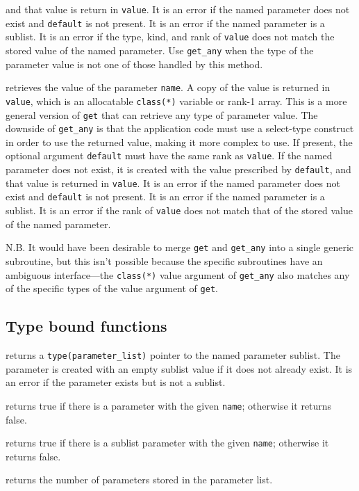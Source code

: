 \documentclass[11pt]{article}
\begin{document}
\begin{description}[style=nextline]
  and that value is return in \texttt{value}.  It is an error if the named
  parameter does not exist and \texttt{default} is not present.  It is an
  error if the named parameter is a sublist. It is an error if the type, kind,
  and rank of \texttt{value} does not match the stored value of the named
  parameter.  Use \texttt{get_any} when the type of the parameter value is not
  one of those handled by this method.
\item[\texttt{get_any(name, value \Lbr,default\Rbr\ \Lbr,stat \Lbr,errmsg\Rbr\Rbr)}]
  retrieves the value of the parameter \texttt{name}.  A copy of the value is
  returned in \texttt{value}, which is an allocatable \texttt{class(*)} variable
  or rank-1 array.  This is a more general version of \texttt{get} that can
  retrieve any type of parameter value.  The downside of \texttt{get_any} is
  that the application code must use a select-type construct in order to use
  the returned value, making it more complex to use.  If present, the optional
  argument \texttt{default} must have the same rank as \texttt{value}.  If the
  named parameter does not exist, it is created with the value prescribed by
  \texttt{default}, and that value is returned in \texttt{value}.  It is an
  error if the named parameter does not exist and \texttt{default} is not
  present.  It is an error if the named parameter is a sublist.  It is an
  error if the rank of \texttt{value} does not match that of the stored value
  of the named parameter. \par
  N.B. It would have been desirable to merge \texttt{get} and \texttt{get_any}
  into a single generic subroutine, but this isn't possible because the
  specific subroutines have an ambiguous interface---the \texttt{class(*)}
  value argument of \texttt{get_any} also matches any of the specific types
  of the value argument of \texttt{get}.
\end{description}

\subsection{Type bound functions}
\begin{description}[style=nextline]\setlength{\itemsep}{0pt}
\item[\texttt{sublist(name \Lbr,stat \Lbr,errmsg\Rbr\Rbr)}]
  returns a \texttt{type(parameter_list)} pointer to the named parameter
  sublist.  The parameter is created with an empty sublist value if it
  does not already exist.  It is an error if the parameter exists but is
  not a sublist.
\item[\texttt{is_parameter(name)}]
  returns true if there is a parameter with the given \texttt{name};
  otherwise it returns false.
\item[\texttt{is_sublist(name)}]
  returns true if there is a sublist parameter with the given \texttt{name};
  otherwise it returns false.
\item[\texttt{count()}]
  returns the number of parameters stored in the parameter list.
\end{description}
\end{document}
